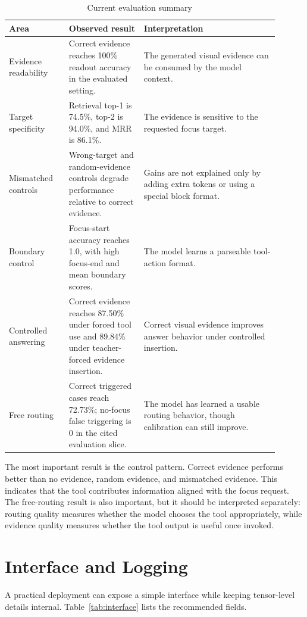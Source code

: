 \documentclass[10pt,twocolumn]{article}
\begin{document}
\begin{table}[t]
\centering
\small
\caption{Current evaluation summary}
\label{tab:evaluation}
\begin{tabular}{p{0.20\linewidth}p{0.25\linewidth}p{0.45\linewidth}}
\toprule
Area & Observed result & Interpretation \\
\midrule
Evidence readability & Correct evidence reaches 100\% readout accuracy in the evaluated setting. & The generated visual evidence can be consumed by the model context. \\
Target specificity & Retrieval top-1 is 74.5\%, top-2 is 94.0\%, and MRR is 86.1\%. & The evidence is sensitive to the requested focus target. \\
Mismatched controls & Wrong-target and random-evidence controls degrade performance relative to correct evidence. & Gains are not explained only by adding extra tokens or using a special block format. \\
Boundary control & Focus-start accuracy reaches 1.0, with high focus-end and mean boundary scores. & The model learns a parseable tool-action format. \\
Controlled answering & Correct evidence reaches 87.50\% under forced tool use and 89.84\% under teacher-forced evidence insertion. & Correct visual evidence improves answer behavior under controlled insertion. \\
Free routing & Correct triggered cases reach 72.73\%; no-focus false triggering is 0 in the cited evaluation slice. & The model has learned a usable routing behavior, though calibration can still improve. \\
\bottomrule
\end{tabular}
\end{table}

The most important result is the control pattern. Correct evidence performs better than no evidence, random evidence, and mismatched evidence. This indicates that the tool contributes information aligned with the focus request. The free-routing result is also important, but it should be interpreted separately: routing quality measures whether the model chooses the tool appropriately, while evidence quality measures whether the tool output is useful once invoked.

\section{Interface and Logging}

A practical deployment can expose a simple interface while keeping tensor-level details internal. Table~\ref{tab:interface} lists the recommended fields.
\end{document}
